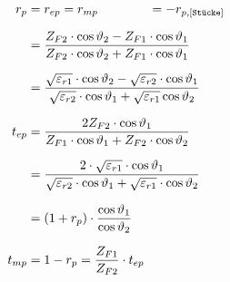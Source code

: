 \begin{equation*}
			\setlength{\jot}{10pt}
\begin{aligned}
	r_p    & =  r_{ep} = r_{mp} \qquad \qquad =-r_{p,[\texttt{Stücke}]}                                                                                                                                                                                                        \\
	& = \frac{Z_{F2} \cdot \cos \vartheta_2-Z_{F1} \cdot \cos \vartheta_1}{Z_{F2} \cdot \cos \vartheta_2+Z_{F1} \cdot \cos \vartheta_1}                                                                                               \\
	& = \frac{\sqrt{\varepsilon_{r1}}\cdot\cos\vartheta_2 - \sqrt{\varepsilon_{r2}}\cdot\cos\vartheta_1}{\sqrt{\varepsilon_{r2}}\cdot\cos\vartheta_1 + \sqrt{\varepsilon_{r1}}\cos\vartheta_2} \\
	t_{ep} & =  \frac{2 Z_{F2} \cdot \cos \vartheta_1}{Z_{F1} \cdot \cos \vartheta_1+Z_{F2} \cdot \cos \vartheta_2}                                                                                                                          \\
		 & = \frac{2\cdot\sqrt{\varepsilon_{r1}}\cdot\cos\vartheta_1}{\sqrt{\varepsilon_{r2}}\cdot\cos\vartheta_1 + \sqrt{\varepsilon_{r1}}\cdot\cos\vartheta_2}\\
	& = (1+r_p) \cdot \dfrac{\cos \vartheta_1}{\cos \vartheta_2}\\
	t_{mp} 
	& = 1-r_p                                                                                                                                                                                                                                                                                                                                                                                        = \frac{Z_{F1}}{Z_{F2}}\cdot t_{ep}
\end{aligned}
\end{equation*}


